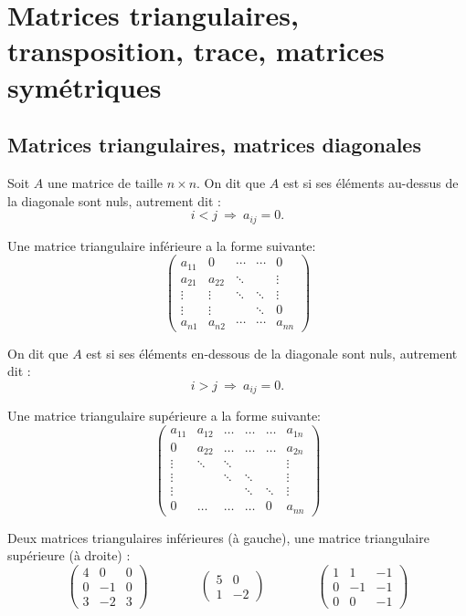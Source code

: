 \documentclass[class=report,crop=false]{standalone}
\begin{document}
\section{Matrices triangulaires, transposition, trace, matrices symétriques}

\subsection{Matrices triangulaires, matrices diagonales}


Soit $A$ une matrice de taille $n \times n$. On dit que $A$ est 
si ses éléments au-dessus de la diagonale sont nuls, autrement dit :
$$
 i < j \  \Longrightarrow \ a_{ij} = 0.$$

Une matrice triangulaire inférieure a la forme suivante:
$$\begin{pmatrix}
a_{11} & 0 &\cdots&\cdots& 0\\
a_{21}&a_{22}&\ddots&&\vdots\\
\vdots&\vdots&\ddots&\ddots&\vdots\\
\vdots & \vdots &&\ddots&0\\
a_{n1}&a_{n2}&\cdots&\cdots&a_{nn}
\end{pmatrix}
$$

\bigskip

On dit que $A$ est  si ses éléments en-dessous
de la diagonale sont nuls,  autrement dit :
$$
i > j \ \Longrightarrow \ a_{ij} = 0. $$

Une matrice triangulaire supérieure a la forme suivante:
$$\begin{pmatrix}
a_{11} & a_{12} &\dots&\dots&\dots & a_{1n}\\
0&a_{22}&\dots&\dots&\dots&a_{2n}\\
\vdots&\ddots&\ddots&&&\vdots\\
\vdots&&\ddots&\ddots&&\vdots\\
\vdots & &&\ddots&\ddots&\vdots\\
0&\dots&\dots&\dots&0&a_{nn}
  \end{pmatrix}
$$


 \begin{exemple}
Deux matrices triangulaires inférieures (à gauche), une matrice triangulaire supérieure (à droite) :
$$
\begin{pmatrix}
 4 & 0 & 0\\
 0 & -1 & 0\\
 3 & -2 & 3
\end{pmatrix}\qquad\qquad
\begin{pmatrix}
 5 & 0\\
 1 & -2
\end{pmatrix}\qquad\qquad
\begin{pmatrix}
 1 & 1 & -1\\
 0 & -1 & -1\\
 0 & 0 & -1
\end{pmatrix}
$$
  \end{exemple}
\end{document}
